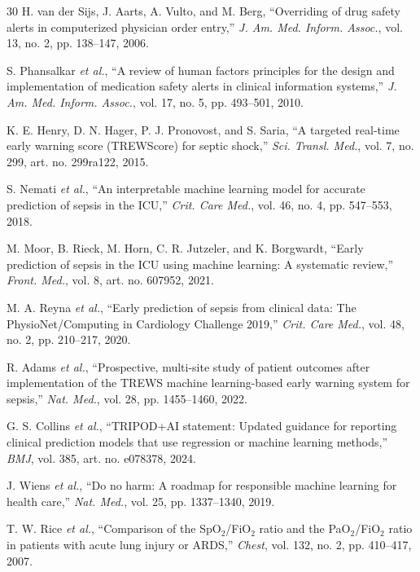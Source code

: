 \documentclass[journal]{IEEEtran}
\begin{document}
\begin{thebibliography}{30}
H. van der Sijs, J. Aarts, A. Vulto, and M. Berg, ``Overriding of drug safety
alerts in computerized physician order entry,'' \emph{J. Am. Med. Inform.
Assoc.}, vol. 13, no. 2, pp. 138--147, 2006.

S. Phansalkar \emph{et al.}, ``A review of human factors principles for the
design and implementation of medication safety alerts in clinical
information systems,'' \emph{J. Am. Med. Inform. Assoc.}, vol. 17, no. 5,
pp. 493--501, 2010.

K. E. Henry, D. N. Hager, P. J. Pronovost, and S. Saria, ``A targeted
real-time early warning score (TREWScore) for septic shock,'' \emph{Sci.
Transl. Med.}, vol. 7, no. 299, art. no. 299ra122, 2015.

S. Nemati \emph{et al.}, ``An interpretable machine learning model for
accurate prediction of sepsis in the ICU,'' \emph{Crit. Care Med.}, vol. 46,
no. 4, pp. 547--553, 2018.

M. Moor, B. Rieck, M. Horn, C. R. Jutzeler, and K. Borgwardt, ``Early
prediction of sepsis in the ICU using machine learning: A systematic
review,'' \emph{Front. Med.}, vol. 8, art. no. 607952, 2021.

M. A. Reyna \emph{et al.}, ``Early prediction of sepsis from clinical data:
The PhysioNet/Computing in Cardiology Challenge 2019,'' \emph{Crit. Care
Med.}, vol. 48, no. 2, pp. 210--217, 2020.

R. Adams \emph{et al.}, ``Prospective, multi-site study of patient outcomes
after implementation of the TREWS machine learning-based early warning system
for sepsis,'' \emph{Nat. Med.}, vol. 28, pp. 1455--1460, 2022.

G. S. Collins \emph{et al.}, ``TRIPOD+AI statement: Updated guidance for
reporting clinical prediction models that use regression or machine learning
methods,'' \emph{BMJ}, vol. 385, art. no. e078378, 2024.

J. Wiens \emph{et al.}, ``Do no harm: A roadmap for responsible machine
learning for health care,'' \emph{Nat. Med.}, vol. 25, pp. 1337--1340, 2019.

T. W. Rice \emph{et al.}, ``Comparison of the SpO$_2$/FiO$_2$ ratio and the
PaO$_2$/FiO$_2$ ratio in patients with acute lung injury or ARDS,''
\emph{Chest}, vol. 132, no. 2, pp. 410--417, 2007.

\end{thebibliography}
\end{document}
